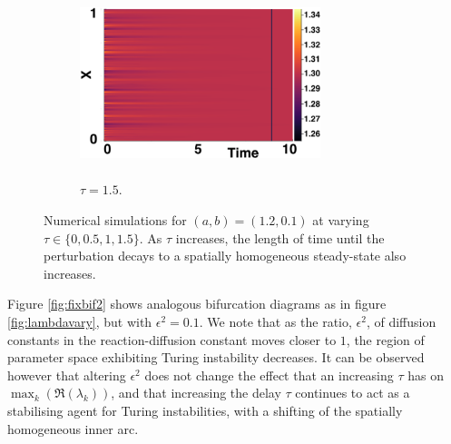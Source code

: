 \begin{figure}[H]
\begin{subfigure}[b]{0.45\textwidth}
        \centering
        \includegraphics[width=7cm,height=5.5cm]{decay4.png}
        \caption{$\tau=1.5$.}
        \label{}
    \end{subfigure}
    \caption{Numerical simulations for $(a,b)=(1.2,0.1)$ at varying $\tau\in\{0,0.5,1,1.5\}$. As $\tau$ increases, the length of time until the perturbation decays to a spatially homogeneous steady-state also increases.}
    \label{fig:decaytime}
\end{figure}
Figure \ref{fig:fixbif2} shows analogous bifurcation diagrams as in figure \ref{fig:lambdavary}, but with $\epsilon^2=0.1$. We note that as the ratio, $\epsilon^2$, of diffusion constants in the reaction-diffusion constant moves closer to $1$, the region of parameter space exhibiting Turing instability decreases. It can be observed however that altering $\epsilon^2$ does not change the effect that an increasing $\tau$ has on $\max_k(\Re(\lambda_k))$, and that increasing the delay $\tau$ continues to act as a stabilising agent for Turing instabilities, with a shifting of the spatially homogeneous inner arc.

